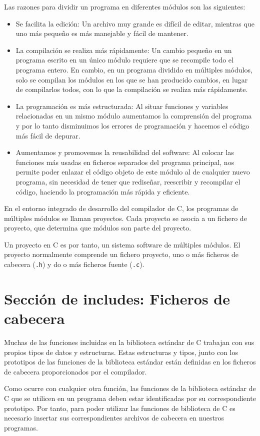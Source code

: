 Las razones para dividir un programa en diferentes módulos son las siguientes:
\begin{itemize}
	\item Se facilita la edición: Un archivo muy grande es difícil de editar, mientras que uno más pequeño es más manejable y fácil de mantener.
	\item La compilación se realiza más rápidamente: Un cambio pequeño en un programa escrito en un único módulo requiere que se recompile todo el programa entero. En cambio, en un programa dividido en múltiples módulos, solo se compilan los módulos en los que se han producido cambios, en lugar de compilarlos todos, con lo que la compilación se realiza más rápidamente.
	\item La programación es más estructurada: Al situar funciones y variables relacionadas en un mismo módulo aumentamos la comprensión del programa y por lo tanto disminuimos los errores de programación y hacemos el código más fácil de depurar.
	\item Aumentamos y promovemos la reusabilidad del software: Al colocar las funciones más usadas en ficheros separados del programa principal, nos permite poder enlazar el código objeto de este módulo al de cualquier nuevo programa, sin necesidad de tener que rediseñar, reescribir y recompilar el código, haciendo la programación más rápida y eficiente.
\end{itemize}
En el entorno integrado de desarrollo del compilador de C, los programas de múltiples módulos se llaman proyectos. Cada proyecto se asocia a un fichero de proyecto, que determina que módulos son parte del proyecto.

Un proyecto en C es por tanto, un sistema software de múltiples módulos. El proyecto normalmente comprende un fichero proyecto, uno o más ficheros de cabecera (\texttt{.h}) y do o más ficheros fuente (\texttt{.c}).

\section{Sección de includes: Ficheros de cabecera}
Muchas de las funciones incluidas en la biblioteca estándar de C trabajan con sus propios tipos de datos y estructuras. Estas estructuras y tipos, junto con los prototipos de las funciones de la biblioteca estándar están definidas en los ficheros de cabecera proporcionados por el compilador.

Como ocurre con cualquier otra función, las funciones de la biblioteca estándar de C que se utilicen en un programa deben estar identificadas por su correspondiente prototipo. Por tanto, para poder utilizar las funciones de biblioteca de C es necesario insertar sus correspondientes archivos de cabecera en nuestros programas.

